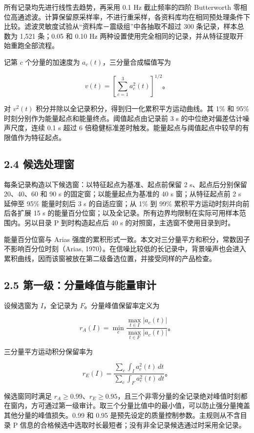 \documentclass[UTF8,a4paper,zihao=5]{ctexart}
\begin{document}
所有记录均先进行线性去趋势，再采用 0.1 Hz 截止频率的四阶 Butterworth 零相位高通滤波。计算保留原采样率，不进行重采样，各资料库均在相同预处理条件下比较。滤波灵敏度试验从``资料库－震级组''中各抽取不超过 300 条记录，样本总数为 1,521 条；0.05 和 0.10 Hz 两种设置使用完全相同的记录，并从特征提取开始重跑全部流程。

记第 \(c\) 个分量的加速度为 \(a_c(t)\)，三分量合成幅值写为

\[
v(t)=\left[\sum_{c=1}^{3}a_c^2(t)\right]^{1/2}。
\]

对 \(v^2(t)\) 积分并除以全记录积分，得到归一化累积平方运动曲线。其 1\% 和 95\% 时刻分别作为能量起点和能量终点。阈值起点由记录前 3 s 的中位绝对偏差估计噪声尺度，连续 0.1 s 超过 6 倍稳健标准差时触发。能量起点与阈值起点中较早的有限值作为特征起点。

\subsection*{2.4 候选处理窗}\label{ux5019ux9009ux5904ux7406ux7a97}

每条记录构造以下候选窗：以特征起点为基准、起点前保留 2 s、起点后分别保留 20、40、60 和 90 s 的固定窗；以能量起点为基准的 40 s 窗；从特征起点前 2 s 延伸至 95\% 能量时刻后 3 s 的自适应窗；从 1\% 到 99\% 累积平方运动时刻并向前后各扩展 15 s 的能量百分位窗；以及全记录。所有边界均限制在实际可用样本范围内。另以目录 P 到时构造起点后 40 s 的对照窗，主选窗不使用目录到时。

能量百分位窗与 Arias 强度的累积形式一致。本文对三分量平方和积分，常数因子不影响百分位时刻（Arias, 1970）。在信噪比较低的长记录中，背景噪声也会进入累积曲线，因而该窗被放在第二级备选位置，并接受同样的产品检查。

\subsection*{2.5 第一级：分量峰值与能量审计}\label{ux7b2cux4e00ux7ea7ux5206ux91cfux5cf0ux503cux4e0eux80fdux91cfux5ba1ux8ba1}

设候选窗为 \(I\)，全记录为 \(F\)。分量峰值保留率定义为

\[
r_A(I)=\min_c\frac{\max_{t\in I}|a_c(t)|}{\max_{t\in F}|a_c(t)|}。
\]

三分量平方运动积分保留率为

\[
r_E(I)=\frac{\sum_c\int_I a_c^2(t)\,dt}{\sum_c\int_F a_c^2(t)\,dt}。
\]

候选窗同时满足 \(r_A\geq0.99\)、\(r_E\geq0.95\)，且三个非零分量的全记录绝对峰值时刻都在窗内，方可通过第一级审计。取三个分量比值中的最小值，可以防止强分量掩盖其他分量的峰值损失。0.99 和 0.95 是预先设定的质量控制参数。主规则从不含目录 P 信息的合格候选中选取时长最短者；没有非全记录候选通过时采用全记录。
\end{document}
